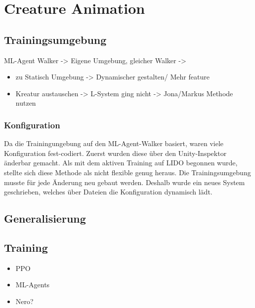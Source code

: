 \section{Creature Animation}

\subsection{Trainingsumgebung}
ML-Agent Walker -> Eigene Umgebung, gleicher Walker -> 
\begin{itemize}
	\item zu Statisch  Umgebung -> Dynamischer gestalten/ Mehr feature
	\item Kreatur austauschen -> L-System ging nicht -> Jona/Markus Methode nutzen
\end{itemize}
\subsubsection{Konfiguration}
Da die Trainingungebung auf den ML-Agent-Walker basiert, waren viele Konfiguration fest-codiert. Zuerst wurden diese über den Unity-Inspektor änderbar gemacht. Als mit dem aktiven Training auf LIDO begonnen wurde, stellte sich diese Methode als nicht flexible genug heraus. Die Trainingsumgebung musste für jede Änderung neu gebaut werden. Deshalb wurde ein neues System geschrieben, welches über Dateien die Konfiguration dynamisch lädt.
\subsection{Generalisierung}
\subsection{Training}
\begin{itemize}
	\item PPO
	\item ML-Agents
	\item Nero?
\end{itemize}
